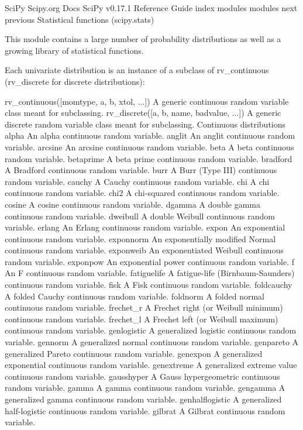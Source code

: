 SciPy
Scipy.org
Docs
SciPy v0.17.1 Reference Guide
index
modules
modules
next
previous
Statistical functions (scipy.stats)

This module contains a large number of probability distributions as well as a growing library of statistical functions.

Each univariate distribution is an instance of a subclass of rv_continuous (rv_discrete for discrete distributions):

rv_continuous([momtype, a, b, xtol, ...])	A generic continuous random variable class meant for subclassing.
rv_discrete([a, b, name, badvalue, ...])	A generic discrete random variable class meant for subclassing.
Continuous distributions
alpha	An alpha continuous random variable.
anglit	An anglit continuous random variable.
arcsine	An arcsine continuous random variable.
beta	A beta continuous random variable.
betaprime	A beta prime continuous random variable.
bradford	A Bradford continuous random variable.
burr	A Burr (Type III) continuous random variable.
cauchy	A Cauchy continuous random variable.
chi	A chi continuous random variable.
chi2	A chi-squared continuous random variable.
cosine	A cosine continuous random variable.
dgamma	A double gamma continuous random variable.
dweibull	A double Weibull continuous random variable.
erlang	An Erlang continuous random variable.
expon	An exponential continuous random variable.
exponnorm	An exponentially modified Normal continuous random variable.
exponweib	An exponentiated Weibull continuous random variable.
exponpow	An exponential power continuous random variable.
f	An F continuous random variable.
fatiguelife	A fatigue-life (Birnbaum-Saunders) continuous random variable.
fisk	A Fisk continuous random variable.
foldcauchy	A folded Cauchy continuous random variable.
foldnorm	A folded normal continuous random variable.
frechet_r	A Frechet right (or Weibull minimum) continuous random variable.
frechet_l	A Frechet left (or Weibull maximum) continuous random variable.
genlogistic	A generalized logistic continuous random variable.
gennorm	A generalized normal continuous random variable.
genpareto	A generalized Pareto continuous random variable.
genexpon	A generalized exponential continuous random variable.
genextreme	A generalized extreme value continuous random variable.
gausshyper	A Gauss hypergeometric continuous random variable.
gamma	A gamma continuous random variable.
gengamma	A generalized gamma continuous random variable.
genhalflogistic	A generalized half-logistic continuous random variable.
gilbrat	A Gilbrat continuous random variable.
